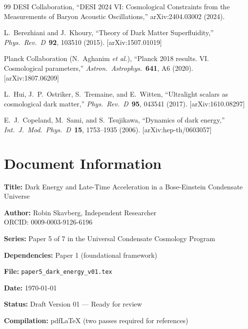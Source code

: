 \documentclass[11pt,a4paper]{article}
\theoremstyle{definition}
\theoremstyle{remark}
\begin{document}
\begin{thebibliography}{99}
DESI Collaboration, ``DESI 2024 VI: Cosmological Constraints from the Measurements of Baryon Acoustic Oscillations,'' arXiv:2404.03002 (2024).

L.~Berezhiani and J.~Khoury, ``Theory of Dark Matter Superfluidity,'' \emph{Phys.\ Rev.\ D}\ \textbf{92}, 103510 (2015). [arXiv:1507.01019]

Planck Collaboration (N.~Aghanim \emph{et al.}), ``Planck 2018 results. VI. Cosmological parameters,'' \emph{Astron.\ Astrophys.}\ \textbf{641}, A6 (2020). [arXiv:1807.06209]

L.~Hui, J.~P.~Ostriker, S.~Tremaine, and E.~Witten, ``Ultralight scalars as cosmological dark matter,'' \emph{Phys.\ Rev.\ D}\ \textbf{95}, 043541 (2017). [arXiv:1610.08297]

E.~J.~Copeland, M.~Sami, and S.~Tsujikawa, ``Dynamics of dark energy,'' \emph{Int.\ J.\ Mod.\ Phys.\ D}\ \textbf{15}, 1753--1935 (2006). [arXiv:hep-th/0603057]

\end{thebibliography}

\section*{Document Information}

\textbf{Title:} Dark Energy and Late-Time Acceleration in a Bose-Einstein Condensate Universe

\textbf{Author:} Robin Skavberg, Independent Researcher\\
ORCID: 0009-0003-9126-6196

\textbf{Series:} Paper 5 of 7 in the Universal Condensate Cosmology Program

\textbf{Dependencies:} Paper 1 (foundational framework)

\textbf{File:} \texttt{paper5\_dark\_energy\_v01.tex}

\textbf{Date:} \today

\textbf{Status:} Draft Version 01 --- Ready for review

\textbf{Compilation:} pdfLaTeX (two passes required for references)
\end{document}
